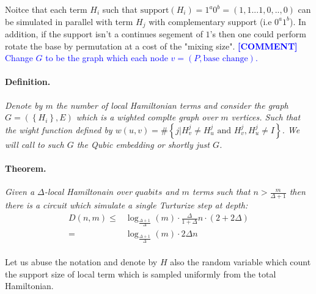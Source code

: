 \documentclass{article}
\newcommand{\commentt}[1]{\textcolor{blue}{ \textbf{[COMMENT]} #1}}
\newcommand{\ctt}[1]{\commentt{#1}}
\begin{document}
\begin{multicols*}{2}
Noitce that each term \(H_i\) such that \(\text{support}(H_{i}) = 1^{a}0^{b} = (1,1...1,0,..,0)\) can be simulated in parallel with term \(H_j\) with complementary support (i.e \(0^{a}1^{b}\)).  
In addition, if the support isn't a continues segement of \(1\)'s then one could perform rotate the base by permutation at a cost of the "mixing size".   
\ctt{Change \(G\) to be the graph which each node \( v = \left(P, \text{base change}\right) \). }

\paragraph{Definition.} \textit{ Denote by $m$ the number of local Hamiltonian terms and consider the graph \(G = \left( \left\{ H_{i} \right\}, E \right)\) which is a wighted complte graph over $m$ vertices. Such that the wight function defined by \(w(u,v) = \#\left\{ j | H_{v}^{j} \neq H_{u}^{j} \text{ and } H_{v}^{j},H_{u}^{j}\neq I \right\} \). We will call to such \(G\) the Qubic embedding or shortly just \(G\). }    

\paragraph{Theorem.} \textit{Given a $\Delta$-local Hamiltonain over $quabits$ and $m$ terms such that $n > \frac{m}{\Delta + 1}$ then there is a circuit which simulate a single Turturize step at depth:}
\begin{equation*}
  \begin{split}
    D\left(n,m\right) \leq & \log_{\frac{\Delta+1}{\Delta}}\left(m\right)\cdot \frac{\Delta}{1+\Delta}n \cdot \left( 2 + 2\Delta \right) \\ = & \log_{\frac{\Delta+1}{\Delta}}\left(m\right)\cdot2\Delta n 
  \end{split}
\end{equation*}

\paragraph{}
 Let us abuse the notation and denote by $H$ also the random variable which count the support size of local term which is sampled uniformly from the total Hamiltonian. 

\end{multicols*}
\end{document}
